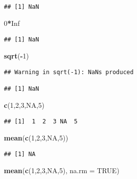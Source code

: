 \documentclass[
]{book}
\newenvironment{Shaded}{\begin{snugshade}}{\end{snugshade}}
\newcommand{\AttributeTok}[1]{\textcolor[rgb]{0.13,0.29,0.53}{#1}}
\newcommand{\ConstantTok}[1]{\textcolor[rgb]{0.56,0.35,0.01}{#1}}
\newcommand{\DecValTok}[1]{\textcolor[rgb]{0.00,0.00,0.81}{#1}}
\newcommand{\FunctionTok}[1]{\textcolor[rgb]{0.13,0.29,0.53}{\textbf{#1}}}
\newcommand{\NormalTok}[1]{#1}
\newcommand{\SpecialCharTok}[1]{\textcolor[rgb]{0.81,0.36,0.00}{\textbf{#1}}}
\theoremstyle{definition}
\theoremstyle{definition}
\theoremstyle{definition}
\theoremstyle{definition}
\theoremstyle{remark}
\begin{document}
\begin{verbatim}
## [1] NaN
\end{verbatim}

\begin{Shaded}
\begin{Highlighting}[]
\DecValTok{0}\SpecialCharTok{*}\ConstantTok{Inf}
\end{Highlighting}
\end{Shaded}

\begin{verbatim}
## [1] NaN
\end{verbatim}

\begin{Shaded}
\begin{Highlighting}[]
\FunctionTok{sqrt}\NormalTok{(}\SpecialCharTok{{-}}\DecValTok{1}\NormalTok{)}
\end{Highlighting}
\end{Shaded}

\begin{verbatim}
## Warning in sqrt(-1): NaNs produced
\end{verbatim}

\begin{verbatim}
## [1] NaN
\end{verbatim}

\begin{Shaded}
\begin{Highlighting}[]
\FunctionTok{c}\NormalTok{(}\DecValTok{1}\NormalTok{,}\DecValTok{2}\NormalTok{,}\DecValTok{3}\NormalTok{,}\ConstantTok{NA}\NormalTok{,}\DecValTok{5}\NormalTok{)}
\end{Highlighting}
\end{Shaded}

\begin{verbatim}
## [1]  1  2  3 NA  5
\end{verbatim}

\begin{Shaded}
\begin{Highlighting}[]
\FunctionTok{mean}\NormalTok{(}\FunctionTok{c}\NormalTok{(}\DecValTok{1}\NormalTok{,}\DecValTok{2}\NormalTok{,}\DecValTok{3}\NormalTok{,}\ConstantTok{NA}\NormalTok{,}\DecValTok{5}\NormalTok{))}
\end{Highlighting}
\end{Shaded}

\begin{verbatim}
## [1] NA
\end{verbatim}

\begin{Shaded}
\begin{Highlighting}[]
\FunctionTok{mean}\NormalTok{(}\FunctionTok{c}\NormalTok{(}\DecValTok{1}\NormalTok{,}\DecValTok{2}\NormalTok{,}\DecValTok{3}\NormalTok{,}\ConstantTok{NA}\NormalTok{,}\DecValTok{5}\NormalTok{), }\AttributeTok{na.rm =} \ConstantTok{TRUE}\NormalTok{)}
\end{Highlighting}
\end{Shaded}
\end{document}
